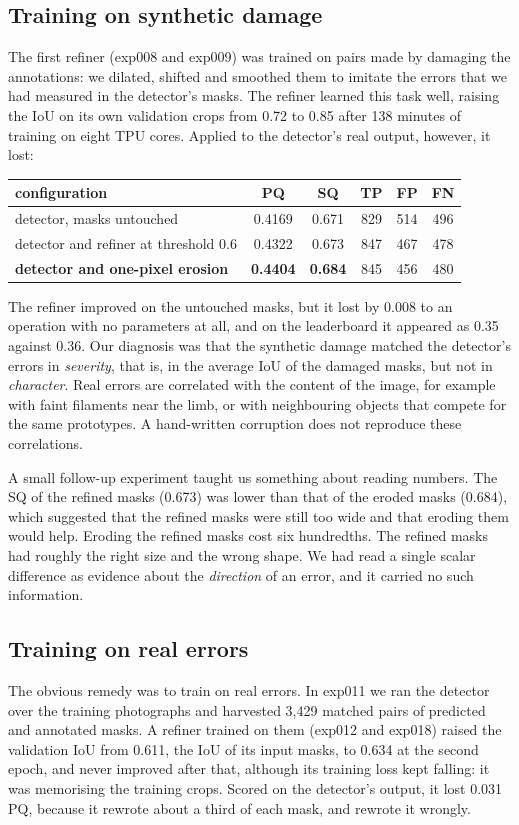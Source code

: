 \subsection{Training on synthetic damage}\label{sec:post-synthetic}
The first refiner (exp008 and exp009) was trained on pairs made by damaging the annotations: we
dilated, shifted and smoothed them to imitate the errors that we had measured in the detector's
masks. The refiner learned this task well, raising the IoU on its own validation crops from 0.72 to
0.85 after 138 minutes of training on eight TPU cores. Applied to the detector's real output,
however, it lost:
\begin{center}\small
\begin{tabular}{@{}lccccc@{}}
\toprule
configuration & PQ & SQ & TP & FP & FN \\
\midrule
detector, masks untouched & 0.4169 & 0.671 & 829 & 514 & 496 \\
detector and refiner at threshold 0.6 & 0.4322 & 0.673 & 847 & 467 & 478 \\
\textbf{detector and one-pixel erosion} & \textbf{0.4404} & \textbf{0.684} & 845 & 456 & 480 \\
\bottomrule
\end{tabular}
\end{center}
The refiner improved on the untouched masks, but it lost by 0.008 to an operation with no parameters
at all, and on the leaderboard it appeared as 0.35 against 0.36. Our diagnosis was that the
synthetic damage matched the detector's errors in \emph{severity}, that is, in the average IoU of the
damaged masks, but not in \emph{character}. Real errors are correlated with the content of the
image, for example with faint filaments near the limb, or with neighbouring objects that compete for
the same prototypes. A hand-written corruption does not reproduce these correlations.

A small follow-up experiment taught us something about reading numbers. The SQ of the refined masks
(0.673) was lower than that of the eroded masks (0.684), which suggested that the refined masks were
still too wide and that eroding them would help. Eroding the refined masks cost six hundredths. The
refined masks had roughly the right size and the wrong shape. We had read a single scalar difference
as evidence about the \emph{direction} of an error, and it carried no such information.

\subsection{Training on real errors}\label{sec:post-real}
The obvious remedy was to train on real errors. In exp011 we ran the detector over the training
photographs and harvested 3,429 matched pairs of predicted and annotated masks. A refiner trained on
them (exp012 and exp018) raised the validation IoU from 0.611, the IoU of its input masks, to 0.634
at the second epoch, and never improved after that, although its training loss kept falling: it
was memorising the training crops. Scored on the detector's output, it lost 0.031 PQ, because it
rewrote about a third of each mask, and rewrote it wrongly.

